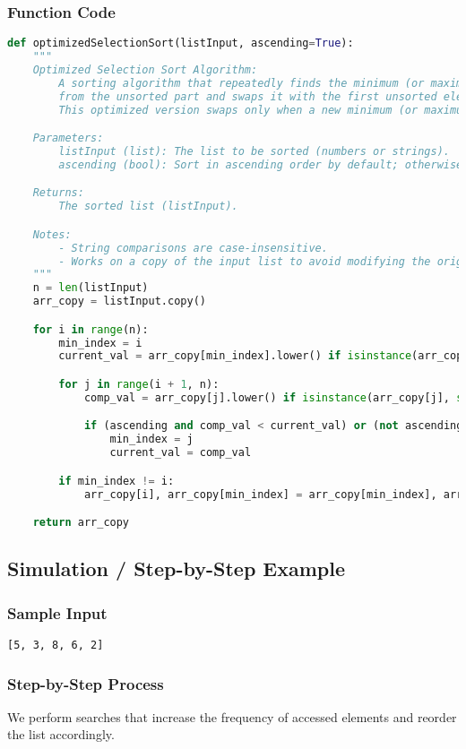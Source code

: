 \documentclass{article}
\begin{document}
\subsubsection*{Function Code}
\begin{lstlisting}[language=Python]
def optimizedSelectionSort(listInput, ascending=True):
    """
    Optimized Selection Sort Algorithm:
        A sorting algorithm that repeatedly finds the minimum (or maximum) element 
        from the unsorted part and swaps it with the first unsorted element. 
        This optimized version swaps only when a new minimum (or maximum) is found.

    Parameters:
        listInput (list): The list to be sorted (numbers or strings).
        ascending (bool): Sort in ascending order by default; otherwise descending.

    Returns: 
        The sorted list (listInput).

    Notes:
        - String comparisons are case-insensitive.
        - Works on a copy of the input list to avoid modifying the original list.
    """
    n = len(listInput)
    arr_copy = listInput.copy()

    for i in range(n):
        min_index = i
        current_val = arr_copy[min_index].lower() if isinstance(arr_copy[min_index], str) else arr_copy[min_index]

        for j in range(i + 1, n):
            comp_val = arr_copy[j].lower() if isinstance(arr_copy[j], str) else arr_copy[j]

            if (ascending and comp_val < current_val) or (not ascending and comp_val > current_val):
                min_index = j
                current_val = comp_val

        if min_index != i:
            arr_copy[i], arr_copy[min_index] = arr_copy[min_index], arr_copy[i]

    return arr_copy
\end{lstlisting}

\subsection*{Simulation / Step-by-Step Example}
\subsubsection*{Sample Input}
\texttt{[5, 3, 8, 6, 2]}
\subsubsection*{Step-by-Step Process}
We perform searches that increase the frequency of accessed elements and reorder the list accordingly.
\end{document}
